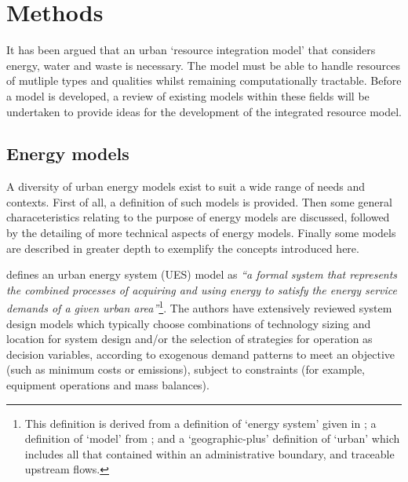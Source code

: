 \section{Methods} \label{sec:methods}
It has been argued that an urban `resource integration model' that considers energy, water and waste is necessary. The model must be able to handle resources of mutliple types and qualities whilst remaining computationally tractable. Before a model is developed, a review of existing models within these fields will be undertaken to provide ideas for the development of the integrated resource model.

\subsection{Energy models} \label{sec:models_energy}
A diversity of urban energy models exist to suit a wide range of needs and contexts. First of all, a definition of such models is provided. Then some general characeteristics relating to the purpose of energy models are discussed, followed by the detailing of more technical aspects of energy models. Finally some models are described in greater depth to exemplify the concepts introduced here.

\citet{Keirstead2012b} defines an urban energy system (UES) model as \emph{``a formal system that represents the combined processes of acquiring and using energy to satisfy the energy service demands of a given urban area''}\footnote{This definition is derived from a definition of `energy system' given in \citet{Jaccard2005}; a definition of `model' from \citet{Rosen2000}; and a `geographic-plus' definition of `urban' which includes all that contained within an administrative boundary, and traceable upstream flows.}. The authors have extensively reviewed system design models which typically choose combinations of technology sizing and location for system design and/or the selection of strategies for operation as decision variables, according to exogenous demand patterns to meet an objective (such as minimum costs or emissions), subject to constraints (for example, equipment operations and mass balances). 

